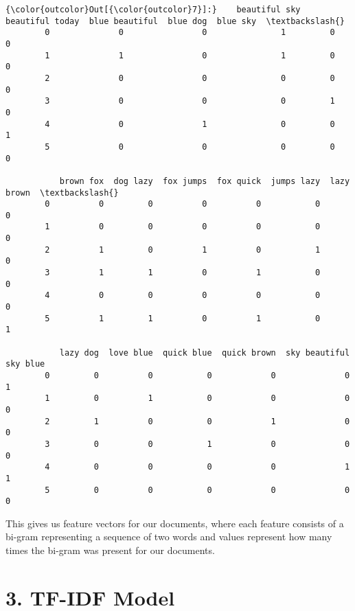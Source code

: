 \documentclass[11pt]{article}
\begin{document}
\begin{Verbatim}[commandchars=\\\{\}]
{\color{outcolor}Out[{\color{outcolor}7}]:}    beautiful sky  beautiful today  blue beautiful  blue dog  blue sky  \textbackslash{}
        0              0                0               1         0         0   
        1              1                0               1         0         0   
        2              0                0               0         0         0   
        3              0                0               0         1         0   
        4              0                1               0         0         1   
        5              0                0               0         0         0   
        
           brown fox  dog lazy  fox jumps  fox quick  jumps lazy  lazy brown  \textbackslash{}
        0          0         0          0          0           0           0   
        1          0         0          0          0           0           0   
        2          1         0          1          0           1           0   
        3          1         1          0          1           0           0   
        4          0         0          0          0           0           0   
        5          1         1          0          1           0           1   
        
           lazy dog  love blue  quick blue  quick brown  sky beautiful  sky blue  
        0         0          0           0            0              0         1  
        1         0          1           0            0              0         0  
        2         1          0           0            1              0         0  
        3         0          0           1            0              0         0  
        4         0          0           0            0              1         1  
        5         0          0           0            0              0         0  
\end{Verbatim}
            
    This gives us feature vectors for our documents, where each feature
consists of a bi-gram representing a sequence of two words and values
represent how many times the bi-gram was present for our documents.

    \hypertarget{tf-idf-model}{%
\section{3. TF-IDF Model}\label{tf-idf-model}}
\end{document}
